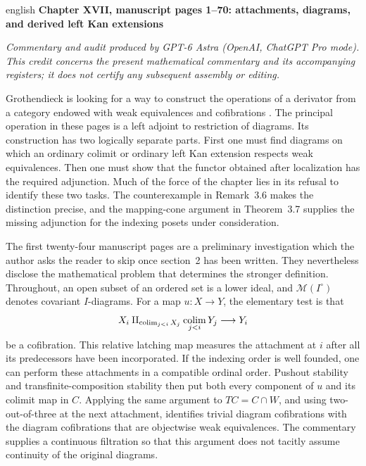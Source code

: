 \begin{otherlanguage*}{english}
\noindent\textbf{Chapter XVII, manuscript pages 1--70: attachments, diagrams, and derived left Kan extensions}

\medskip
\noindent\emph{Commentary and audit produced by GPT-6 Astra (OpenAI, ChatGPT Pro mode). This credit concerns the present mathematical commentary and its accompanying registers; it does not certify any subsequent assembly or editing.}

\medskip
Grothendieck is looking for a way to construct the operations of a derivator from a category endowed with weak equivalences and cofibrations \citep{Grothendieck1990XVII}. The principal operation in these pages is a left adjoint to restriction of diagrams. Its construction has two logically separate parts. First one must find diagrams on which an ordinary colimit or ordinary left Kan extension respects weak equivalences. Then one must show that the functor obtained after localization has the required adjunction. Much of the force of the chapter lies in its refusal to identify these two tasks. The counterexample in Remark~3.6 makes the distinction precise, and the mapping-cone argument in Theorem~3.7 supplies the missing adjunction for the indexing posets under consideration.

The first twenty-four manuscript pages are a preliminary investigation which the author asks the reader to skip once section~2 has been written. They nevertheless disclose the mathematical problem that determines the stronger definition. Throughout, an open subset of an ordered set is a lower ideal, and $\mathcal M(I^\circ)$ denotes covariant $I$-diagrams. For a map $u:X\to Y$, the elementary test is that
\[
 X_i\amalg_{\mathop{\rm colim}_{j<i}X_j}
       \mathop{\rm colim}_{j<i}Y_j\longrightarrow Y_i
\]
be a cofibration. This relative latching map measures the attachment at $i$ after all its predecessors have been incorporated. If the indexing order is well founded, one can perform these attachments in a compatible ordinal order. Pushout stability and transfinite-composition stability then put both every component of $u$ and its colimit map in $C$. Applying the same argument to $TC=C\cap W$, and using two-out-of-three at the next attachment, identifies trivial diagram cofibrations with the diagram cofibrations that are objectwise weak equivalences. The commentary supplies a continuous filtration so that this argument does not tacitly assume continuity of the original diagrams.


\end{otherlanguage*}
